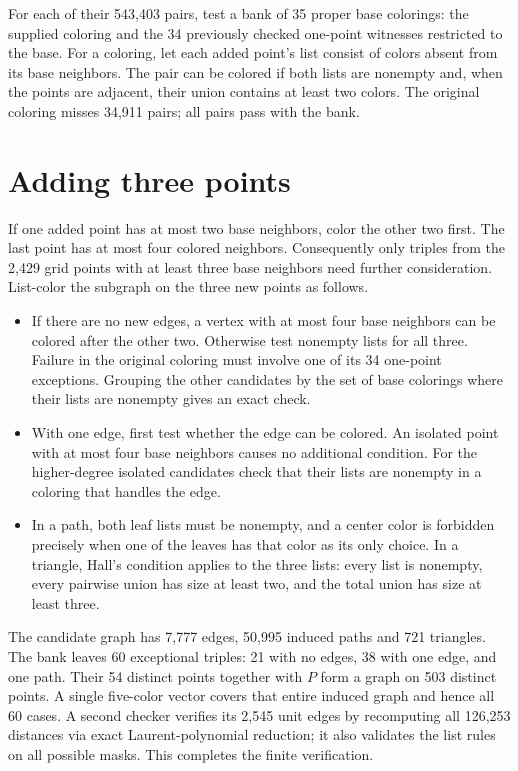 \documentclass[11pt,letterpaper]{article}
\begin{document}
For each of their 543,403 pairs, test a bank of 35 proper base
colorings: the supplied coloring and the 34 previously checked
one-point witnesses restricted to the base. For a coloring,
let each added point's list consist of colors absent from its
base neighbors. The pair can be colored if both lists are
nonempty and, when the points are adjacent, their union contains
at least two colors. The original coloring misses 34,911 pairs;
all pairs pass with the bank.

\section{Adding three points}

If one added point has at most two base neighbors, color the
other two first. The last point has at most four colored
neighbors. Consequently only triples from the 2,429 grid points
with at least three base neighbors need further consideration.
List-color the subgraph on the three new points as follows.

\begin{itemize}
\item If there are no new edges, a vertex with at most four base
neighbors can be colored after the other two. Otherwise test
nonempty lists for all three. Failure in the original coloring
must involve one of its 34 one-point exceptions. Grouping the
other candidates by the set of base colorings where their lists
are nonempty gives an exact check.
\item With one edge, first test whether the edge can be colored.
An isolated point with at most four base neighbors causes no
additional condition. For the higher-degree isolated candidates
check that their lists are nonempty in a coloring that handles the edge.
\item In a path, both leaf lists must be nonempty, and a center
color is forbidden precisely when one of the leaves has that
color as its only choice. In a triangle, Hall's condition applies
to the three lists: every list is nonempty, every pairwise union
has size at least two, and the total union has size at least three.
\end{itemize}

The candidate graph has 7,777 edges, 50,995 induced paths and
721 triangles. The bank leaves 60 exceptional triples: 21 with no
edges, 38 with one edge, and one path. Their 54 distinct points
together with \(P\) form a graph on 503 distinct points. A single
five-color vector covers that entire induced graph and hence all
60 cases. A second checker verifies its 2,545 unit edges by
recomputing all 126,253 distances via exact Laurent-polynomial
reduction; it also validates the list rules on all possible masks.
This completes the finite verification.
\end{document}
